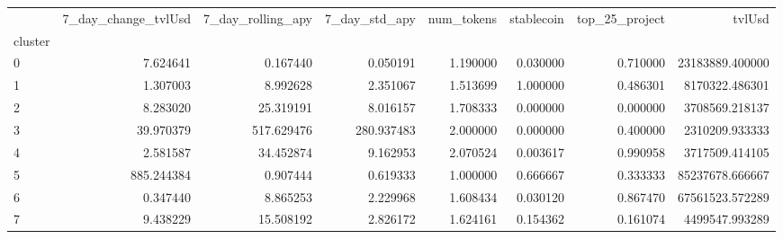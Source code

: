 \begin{tabular}{lrrrrrrr}
\toprule
 & 7_day_change_tvlUsd & 7_day_rolling_apy & 7_day_std_apy & num_tokens & stablecoin & top_25_project & tvlUsd \\
cluster &  &  &  &  &  &  &  \\
\midrule
0 & 7.624641 & 0.167440 & 0.050191 & 1.190000 & 0.030000 & 0.710000 & 23183889.400000 \\
1 & 1.307003 & 8.992628 & 2.351067 & 1.513699 & 1.000000 & 0.486301 & 8170322.486301 \\
2 & 8.283020 & 25.319191 & 8.016157 & 1.708333 & 0.000000 & 0.000000 & 3708569.218137 \\
3 & 39.970379 & 517.629476 & 280.937483 & 2.000000 & 0.000000 & 0.400000 & 2310209.933333 \\
4 & 2.581587 & 34.452874 & 9.162953 & 2.070524 & 0.003617 & 0.990958 & 3717509.414105 \\
5 & 885.244384 & 0.907444 & 0.619333 & 1.000000 & 0.666667 & 0.333333 & 85237678.666667 \\
6 & 0.347440 & 8.865253 & 2.229968 & 1.608434 & 0.030120 & 0.867470 & 67561523.572289 \\
7 & 9.438229 & 15.508192 & 2.826172 & 1.624161 & 0.154362 & 0.161074 & 4499547.993289 \\
\bottomrule
\end{tabular}
